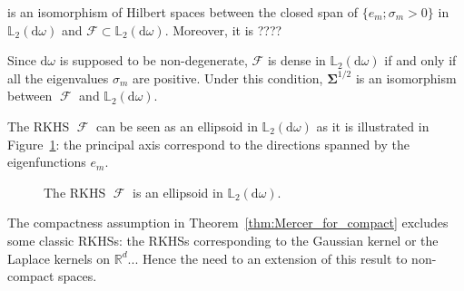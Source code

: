 \documentclass[twoside,11pt]{book}
\numberwithin{theorem}{chapter}
\numberwithin{definition}{chapter}
\numberwithin{proposition}{chapter}
\numberwithin{corollary}{chapter}
\numberwithin{example}{chapter}
\numberwithin{lemma}{chapter}
\numberwithin{assumption}{chapter}
\DeclareMathOperator{\F}{\mathcal{F}}
\begin{document}

  is an isomorphism of Hilbert spaces between the closed span of $\{ e_{m}; \sigma_m>0\}$ in $\mathbb{L}_{2}(\mathrm{d}\omega)$ and $\mathcal{F} \subset \mathbb{L}_{2}(\mathrm{d}\omega)$. Moreover, it is ????


Since $\mathrm{d}\omega$ is supposed to be non-degenerate, $\mathcal{F}$ is dense in $\mathbb{L}_{2}(\mathrm{d}\omega)$ if and only if all the eigenvalues $\sigma_{m}$ are positive. Under this condition, $\bm{\Sigma}^{1/2}$ is an isomorphism between  $\F$ and $\mathbb{L}_{2}(\mathrm{d}\omega)$.




  The RKHS $\F$ can be seen as an ellipsoid in $\mathbb{L}_{2}(\mathrm{d}\omega)$ as it is illustrated in Figure~\ref{fig:rkhs_is_ellipsoid}: the principal axis correspond to the directions spanned by the eigenfunctions $e_{m}$.

\begin{figure}
    \centering
    \resizebox{0.6\textwidth}{!}{}
    \caption{The RKHS $\F$ is an ellipsoid in $\mathbb{L}_{2}(\mathrm{d}\omega)$. \label{fig:rkhs_is_ellipsoid}}
\end{figure}


The compactness assumption in Theorem~\ref{thm:Mercer_for_compact} excludes some classic RKHSs: the RKHSs corresponding to the Gaussian kernel or the Laplace kernels on $\mathbb{R}^{d}$...
Hence the need to an extension of this result to non-compact spaces.
\end{document}
